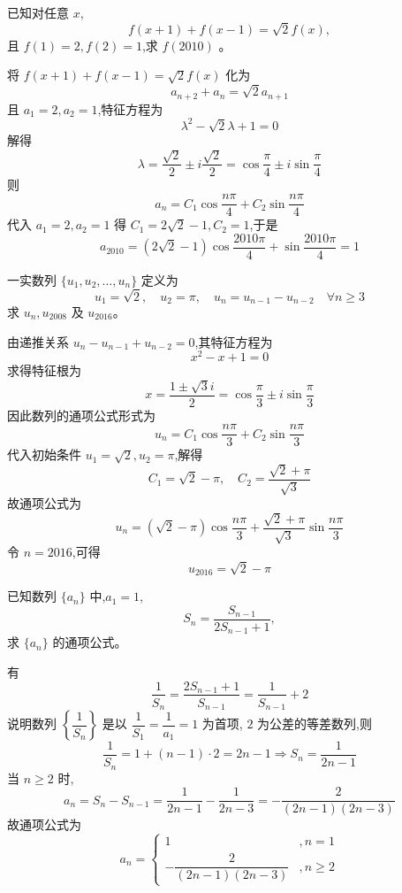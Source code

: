 \begin{questions}
    \question 已知对任意 $x$, 
    \[
    f(x+1) + f(x-1) = \sqrt{2} f(x),
    \]
    且 $f(1) = 2, f(2) = 1$,求 $f(2010)$ 。
    \begin{solution}
        将 $f(x+1) + f(x-1) = \sqrt{2} f(x)$ 化为 
        \[
        a_{n+2} + a_n = \sqrt{2} a_{n+1}
        \]
        且 $a_1 = 2, a_2 = 1$,特征方程为 
        \[
        \lambda^2 - \sqrt{2}\lambda + 1 = 0 
        \]
        解得
        \[
        \lambda = \frac{\sqrt{2}}{2} \pm i \frac{\sqrt{2}}{2} = \cos \frac{\pi}{4} \pm i \sin \frac{\pi}{4}
        \]
        则 
        \[
        a_n = C_1 \cos \frac{n\pi}{4} + C_2 \sin \frac{n\pi}{4}
        \]
        代入 $a_1=2, a_2=1$ 得 $C_1 = 2\sqrt{2}-1, C_2 = 1$,于是
        \[
        a_{2010} = (2\sqrt{2}-1) \cos \frac{2010\pi}{4} + \sin \frac{2010\pi}{4} = 1
        \]
    \end{solution}

    \question 一实数列 $\{u_1, u_2, \dots, u_n\}$ 定义为
    \[
    u_1 = \sqrt{2},\quad u_2 = \pi,\quad u_n = u_{n-1} - u_{n-2} \quad \forall n \ge 3
    \]
    求 $u_n, u_{2008}$ 及 $u_{2016}$。
    \begin{solution}
        由递推关系 $u_n - u_{n-1} + u_{n-2} = 0$,其特征方程为
        \[
        x^2 - x + 1 = 0
        \]
        求得特征根为
        \[
        x = \frac{1 \pm \sqrt{3}i}{2} = \cos \frac{\pi}{3} \pm i \sin \frac{\pi}{3}
        \]
        因此数列的通项公式形式为
        \[
        u_n = C_1 \cos \frac{n\pi}{3} + C_2 \sin \frac{n\pi}{3}
        \]
        代入初始条件 $u_1 = \sqrt{2}, u_2 = \pi$,解得
        \[
        C_1 = \sqrt{2} - \pi,\quad C_2 = \frac{\sqrt{2} + \pi}{\sqrt{3}}
        \]
        故通项公式为
        \[
        u_n = (\sqrt{2} - \pi) \cos \frac{n\pi}{3} + \frac{\sqrt{2} + \pi}{\sqrt{3}} \sin \frac{n\pi}{3}
        \]
        令 $n=2016$,可得
        \[
        u_{2016} = \sqrt{2} - \pi
        \]
    \end{solution}

    \question 已知数列 $\{a_n\}$ 中,$a_1 = 1$, 
    \[
    S_n = \frac{S_{n-1}}{2S_{n-1} + 1},
    \]
    求 $\{a_n\}$ 的通项公式。
    \begin{solution}
        有
        \[ 
        \frac{1}{S_n} = \frac{2S_{n-1} + 1}{S_{n-1}} = \frac{1}{S_{n-1}} + 2 
        \]
        说明数列 $\left\{\dfrac{1}{S_n}\right\}$ 是以 $\dfrac{1}{S_1} = \dfrac{1}{a_1} = 1$ 为首项, $2$ 为公差的等差数列,则 
        \[
        \frac{1}{S_n} = 1 + (n-1) \cdot 2 = 2n - 1 \Rightarrow S_n = \frac{1}{2n-1}
        \]
        当 $n \ge 2$ 时,
        \[ 
        a_n = S_n - S_{n-1} = \frac{1}{2n-1} - \frac{1}{2n-3} = -\frac{2}{(2n-1)(2n-3)} 
        \]
        故通项公式为 
        \[
        a_n = \begin{cases} 1 & ,n=1 \\[4pt] -\dfrac{2}{(2n-1)(2n-3)} & ,n \ge 2 \end{cases}
        \]
    \end{solution}


\end{questions}
